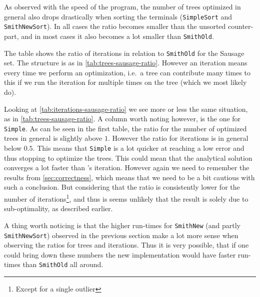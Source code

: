 As observed with the speed of the program, the number of trees optimized in
general also drops drastically when sorting the terminals (\texttt{SimpleSort}
and \texttt{SmithNewSort}). In all cases the ratio becomes smaller than the
unsorted counter-part, and in most cases it also becomes a lot smaller than
\texttt{SmithOld}.

\begin{table}[htbp]
  \centering
  
  \caption[Iteration ratio for Sausage]{The table shows the ratio of iterations
    in relation to \texttt{SmithOld} for the Sausage set. The structure is as
    in \cref{tab:trees-sausage-ratio}. However an iteration means every time we
    perform an optimization, i.e.\ a tree can contribute many times to this if
    we run the iteration for multiple times on the tree (which we most likely
    do).\label{tab:iterations-sausage-ratio}}
\end{table}

Looking at \cref{tab:iterations-sausage-ratio} we see more or less the same
situation, as in \cref{tab:trees-sausage-ratio}. A column worth noting however,
is the one for \texttt{Simple}. As can be seen in the first table, the ratio for
the number of optimized trees in general is slightly above $1$. However the
ratio for iterations is in general below $0.5$. This means that \texttt{Simple}
is a lot quicker at reaching a low error and thus stopping to optimize the
trees. This could mean that the analytical solution converges a lot faster than
\citeauthor{smith1992}'s iteration. However again we need to remember the
results from \cref{sec:correctness}, which means that we need to be a bit
cautious with such a conclusion. But considering that the ratio is consistently lower
for the number of iterations\footnote{Except for a single outlier}, and thus is
seems unlikely that the result is solely due to sub-optimality, as described
earlier.

A thing worth noticing is that the higher run-times for \texttt{SmithNew} (and
partly \texttt{SmithNewSort}) observed in the previous section make a lot more
sense when observing the ratios for trees and iterations. Thus it is very
possible, that if one could bring down these numbers the new implementation
would have faster run-times than \texttt{SmithOld} all around.

